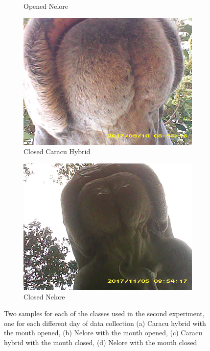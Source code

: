 \documentclass[preprint,10pt,5p]{elsarticle}
\begin{document}
\begin{figure}
\begin{subfigure}{0.2\textwidth}
     \caption{Opened Nelore}
     \label{fig:novopen}
   \end{subfigure}
  \quad
  \begin{subfigure}{0.2\textwidth}
     \includegraphics[width=1\linewidth]{figures/sep_closed_caranelo.png}
     \caption{Closed Caracu Hybrid}
     \label{fig:sepclo}
   \end{subfigure}
  \begin{subfigure}{0.2\textwidth}
     \includegraphics[width=1\linewidth]{figures/nov_closed_nelore.png}
     \caption{Closed Nelore}
     \label{fig:novclo}
   \end{subfigure}

   \caption{Two samples for each of the classes used in the second experiment, one for each different day of data collection (a) Caracu hybrid with the mouth opened, (b) Nelore with the mouth opened, (c) Caracu hybrid with the mouth closed, (d) Nelore with the mouth closed}
   \label{fig:second}
\end{figure}
 
\end{document}
